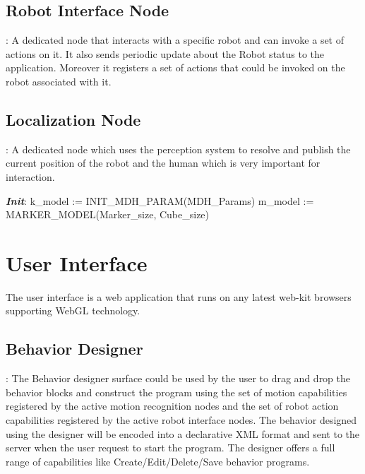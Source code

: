 \subsection{Robot Interface Node} : A dedicated node that interacts with a specific robot and can invoke a set of actions on it. It also sends periodic update about the Robot status to the application. Moreover it registers a set of actions that could be invoked on the robot associated with it.
\subsection{Localization Node} : A dedicated node which uses the perception system to resolve and publish the current position of the robot and the human which is very important for interaction.

\begin{algorithm}
 \textbf{\emph{Init}}:\;
 k\_model := INIT\_MDH\_PARAM(MDH\_Params)\;
 m\_model := MARKER\_MODEL(Marker\_size, Cube\_size)\;
\end{algorithm}


\section{User Interface}
\label{ssec:ui_comp}
The user interface is a web application that runs on any latest web-kit browsers supporting WebGL technology. 

\subsection{Behavior Designer}: The Behavior designer surface could be used by the user to drag and drop the behavior blocks and construct the program using the set of motion capabilities registered by the active motion recognition nodes and the set of robot action capabilities registered by the active robot interface nodes. The behavior designed using the designer will be encoded into a declarative XML format and sent to the server when the user request to start the program. The designer offers a full range of capabilities like Create/Edit/Delete/Save behavior programs.

